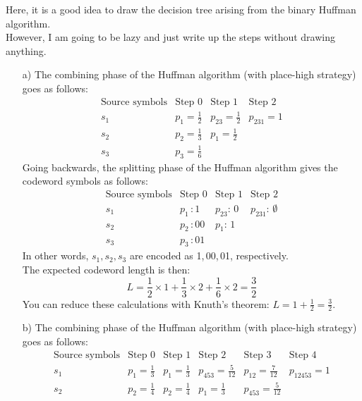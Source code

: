 \documentclass[11pt]{article}
\begin{document}
\bigskip
{} Here, it is a good idea to draw the decision tree arising from the binary Huffman algorithm.\\
  However, I am going to be lazy and just write up the steps without drawing anything.
\begin{itemize}
  \item[{a)}] The combining phase of the Huffman algorithm (with place-high strategy) goes as follows:
     \[\begin{array}{clll}
 \text{Source symbols}& \text{Step 0}     & \text{Step 1}        & \text{Step 2}\\[1mm]
         s_1          & p_1 = \frac{1}{2} & p_{23} = \frac{1}{2} & p_{231} = 1\\[1mm]
         s_2          & p_2 = \frac{1}{3} & p_1    = \frac{1}{2}\\[1mm]
         s_3          & p_3 = \frac{1}{6}
     \end{array}\]
     Going backwards, the splitting phase of the Huffman algorithm gives the codeword symbols as follows:
     \[\begin{array}{clll}
 \text{Source symbols}& \text{Step 0}     & \text{Step 1}        & \text{Step 2}\\[1mm]
         s_1          & p_1\,: 1          & p_{23}:\, 0 & p_{231}:\,\emptyset\\[1mm]
         s_2          & p_2\,: 00         & p_1:   \, 1 &\\[1mm]
         s_3          & p_3\,: 01
     \end{array}\]
     In other words, $s_1,s_2,s_3$ are encoded as 1,\,00,\,01, respectively.\\
     The expected codeword length is then:
     \[
       L = \frac{1}{2}\times 1 + \frac{1}{3}\times 2 + \frac{1}{6}\times 2
         = \frac{3}{2}
     \]
     You can reduce these calculations with Knuth's theorem: $L = 1 + \frac{1}{2} = \frac{3}{2}$.
  \item[{b)}] The combining phase of the Huffman algorithm (with place-high strategy) goes as follows:
     \[\begin{array}{clllll}
 \text{Source symbols}& \text{Step 0}     & \text{Step 1}          & \text{Step 2}          & \text{Step 3}          & \text{Step 4}\\[1mm]
         s_1          & p_1 = \frac{1}{3} & p_1    = \frac{1}{3}   & p_{453} = \frac{5}{12} & p_{12}  = \frac{7}{12} & p_{12453} = 1\\[1mm]
         s_2          & p_2 = \frac{1}{4} & p_2    = \frac{1}{4}   & p_1     = \frac{1}{3}  & p_{453} = \frac{5}{12}\\[1mm]

\end{array}\]
\end{itemize}
\end{document}

